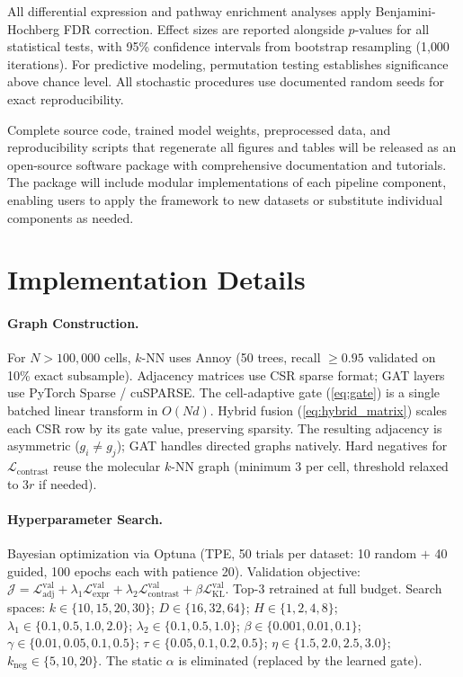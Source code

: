 \documentclass{article}
\newcommand{\KL}{\mathrm{KL}}
\begin{document}
All differential expression and pathway enrichment analyses apply Benjamini-Hochberg FDR correction. Effect sizes are reported alongside $p$-values for all statistical tests, with 95\% confidence intervals from bootstrap resampling (1{,}000 iterations). For predictive modeling, permutation testing establishes significance above chance level. All stochastic procedures use documented random seeds for exact reproducibility.

Complete source code, trained model weights, preprocessed data, and reproducibility scripts that regenerate all figures and tables will be released as an open-source software package with comprehensive documentation and tutorials. The package will include modular implementations of each pipeline component, enabling users to apply the framework to new datasets or substitute individual components as needed.



\appendix

\section{Implementation Details}
\label{app:implementation}

\paragraph{Graph Construction.} For $N > 100{,}000$ cells, $k$-NN uses Annoy (50 trees, recall $\geq 0.95$ validated on 10\% exact subsample). Adjacency matrices use CSR sparse format; GAT layers use PyTorch Sparse / cuSPARSE. The cell-adaptive gate (\cref{eq:gate}) is a single batched linear transform in $O(Nd)$. Hybrid fusion (\cref{eq:hybrid_matrix}) scales each CSR row by its gate value, preserving sparsity. The resulting adjacency is asymmetric ($g_i \neq g_j$); GAT handles directed graphs natively. Hard negatives for $\mathcal{L}_{\text{contrast}}$ reuse the molecular $k$-NN graph (minimum 3 per cell, threshold relaxed to $3r$ if needed).

\paragraph{Hyperparameter Search.} Bayesian optimization via Optuna (TPE, 50 trials per dataset: 10 random $+$ 40 guided, 100 epochs each with patience 20). Validation objective: $\mathcal{J} = \mathcal{L}_{\text{adj}}^{\text{val}} + \lambda_1 \mathcal{L}_{\text{expr}}^{\text{val}} + \lambda_2 \mathcal{L}_{\text{contrast}}^{\text{val}} + \beta \mathcal{L}_{\KL}^{\text{val}}$. Top-3 retrained at full budget. Search spaces: $k \in \{10,15,20,30\}$; $D \in \{16,32,64\}$; $H \in \{1,2,4,8\}$; $\lambda_1 \in \{0.1,0.5,1.0,2.0\}$; $\lambda_2 \in \{0.1,0.5,1.0\}$; $\beta \in \{0.001,0.01,0.1\}$; $\gamma \in \{0.01,0.05,0.1,0.5\}$; $\tau \in \{0.05,0.1,0.2,0.5\}$; $\eta \in \{1.5,2.0,2.5,3.0\}$; $k_{\text{neg}} \in \{5,10,20\}$. The static $\alpha$ is eliminated (replaced by the learned gate).
\end{document}
